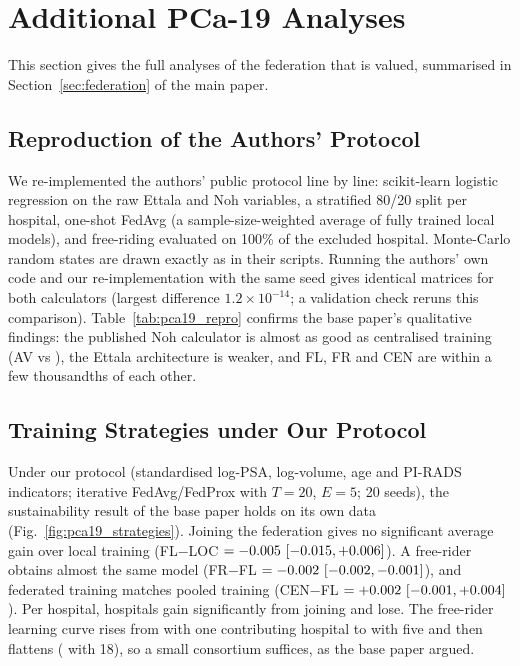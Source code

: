 \section{Additional PCa-19 Analyses}
\label{sec:pca19_more}
This section gives the full analyses of the federation that is valued, summarised in Section~\ref{sec:federation} of the main paper.

\subsection{Reproduction of the Authors' Protocol}
\label{sec:p19_repro}
We re-implemented the authors' public protocol line by line: scikit-learn logistic regression on the raw Ettala and Noh variables, a stratified 80/20 split per hospital, one-shot FedAvg (a sample-size-weighted average of fully trained local models), and free-riding evaluated on 100\% of the excluded hospital. Monte-Carlo random states are drawn exactly as in their scripts. Running the authors' own code and our re-implementation with the same seed gives identical matrices for both calculators (largest difference $1.2\times10^{-14}$; a validation check reruns this comparison). Table~\ref{tab:pca19_repro} confirms the base paper's qualitative findings: the published Noh calculator is almost as good as centralised training (AV \pRepNohBL{} vs \pRepNohCEN{}), the Ettala architecture is weaker, and FL, FR and CEN are within a few thousandths of each other.



\subsection{Training Strategies under Our Protocol}
Under our protocol (standardised log-PSA, log-volume, age and PI-RADS indicators; iterative FedAvg/FedProx with $T=20$, $E=5$; 20 seeds), the sustainability result of the base paper holds on its own data (Fig.~\ref{fig:pca19_strategies}). Joining the federation gives no significant average gain over local training (FL$-$LOC $=-0.005\ [-0.015, +0.006]$). A free-rider obtains almost the same model (FR$-$FL $=-0.002\ [-0.002, -0.001]$), and federated training matches pooled training (CEN$-$FL $=+0.002\ [-0.001, +0.004]$). Per hospital, \pGainSig{} hospitals gain significantly from joining and \pLossSig{} lose. The free-rider learning curve rises from \pLcFrOne{} with one contributing hospital to \pLcFrFive{} with five and then flattens (\pLcFrLast{} with 18), so a small consortium suffices, as the base paper argued.


